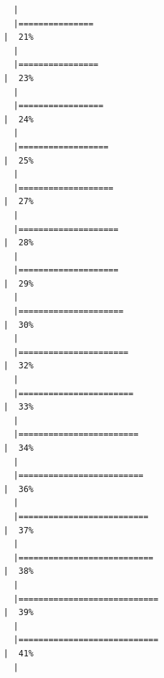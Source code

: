 \documentclass[
  letterpaper,
  DIV=11,
  numbers=noendperiod]{scrartcl}
\begin{document}
\begin{verbatim}
  |                                                                            
  |===============                                                       |  21%
  |                                                                            
  |================                                                      |  23%
  |                                                                            
  |=================                                                     |  24%
  |                                                                            
  |==================                                                    |  25%
  |                                                                            
  |===================                                                   |  27%
  |                                                                            
  |====================                                                  |  28%
  |                                                                            
  |====================                                                  |  29%
  |                                                                            
  |=====================                                                 |  30%
  |                                                                            
  |======================                                                |  32%
  |                                                                            
  |=======================                                               |  33%
  |                                                                            
  |========================                                              |  34%
  |                                                                            
  |=========================                                             |  36%
  |                                                                            
  |==========================                                            |  37%
  |                                                                            
  |===========================                                           |  38%
  |                                                                            
  |============================                                          |  39%
  |                                                                            
  |============================                                          |  41%
  |                                                                            

\end{verbatim}
\end{document}
